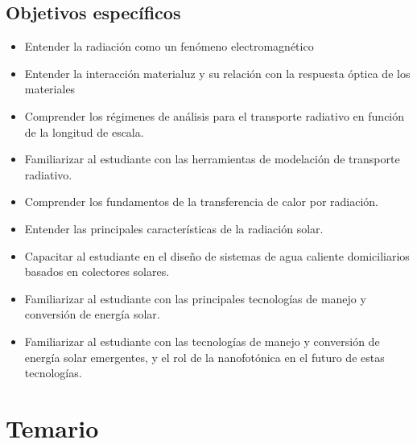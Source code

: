 \documentclass[letterpaper,10pt,english]{jupyterBook}
\begin{document}
\subsection{Objetivos específicos}
\label{\detokenize{0_introduccion/0_introduccion:objetivos-especificos}}\begin{itemize}
\item {} 
\sphinxAtStartPar
Entender la radiación como un fenómeno electromagnético

\item {} 
\sphinxAtStartPar
Entender la interacción materia\sphinxhyphen{}luz y su relación con la respuesta óptica de los materiales

\item {} 
\sphinxAtStartPar
Comprender los régimenes de análisis para el transporte radiativo en función de la longitud de escala.

\item {} 
\sphinxAtStartPar
Familiarizar al estudiante con las herramientas de modelación de transporte radiativo.

\item {} 
\sphinxAtStartPar
Comprender los fundamentos de la transferencia de calor por radiación.

\item {} 
\sphinxAtStartPar
Entender las principales características de la radiación solar.

\item {} 
\sphinxAtStartPar
Capacitar al estudiante en el diseño de sistemas de agua caliente domiciliarios basados en colectores solares.

\item {} 
\sphinxAtStartPar
Familiarizar al estudiante con las principales tecnologías de manejo y conversión de energía solar.

\item {} 
\sphinxAtStartPar
Familiarizar al estudiante con las tecnologías de manejo y conversión de energía solar emergentes, y el rol de la nanofotónica en el futuro de estas tecnologías.

\end{itemize}


\section{Temario}
\label{\detokenize{0_introduccion/0_introduccion:temario}}
\end{document}
